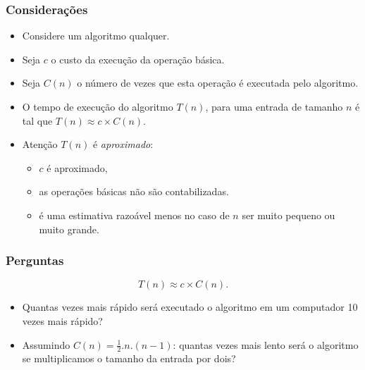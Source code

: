 \documentclass[handout]{beamer}
\begin{document}
\begin{frame}
  \frametitle{Considerações}

  \begin{itemize}
  \item Considere um algoritmo qualquer.
  \item Seja $c$ o custo da execução da operação básica.
  \item Seja $C(n)$ o número de vezes que esta operação é executada pelo
    algoritmo.
  \item O tempo de execução do algoritmo $T(n)$, para uma entrada de tamanho $n$
    é tal que $T(n) \approx c \times C(n)$.
  \item Atenção $T(n)$ é \emph{aproximado}: 
    \begin{itemize}
      \item $c$ é aproximado, 
      \item as operações básicas não são contabilizadas.
      \item é uma estimativa razoável menos no caso de $n$ ser muito pequeno ou
        muito grande.
      \end{itemize}
  \end{itemize}

\end{frame}

\begin{frame}
  \frametitle{Perguntas}

  $$T(n) \approx c \times C(n).$$

  \begin{itemize}
  \item Quantas vezes mais rápido será executado o algoritmo em um computador 10
    vezes mais rápido?

  \item Assumindo $C(n) = \frac{1}{2}.n.(n-1)$: quantas vezes mais lento será o
    algoritmo se multiplicamos o tamanho da entrada por dois?

  \end{itemize}

\end{frame}
\end{document}
